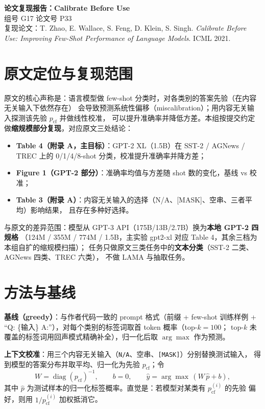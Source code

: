 \documentclass[11pt,a4paper]{ctexart}
\begin{document}
\begin{center}
{\LARGE\bfseries 论文复现报告：Calibrate Before Use}\\[4pt]
{\large 组号 G17 \quad 论文号 P33}\\[2pt]
{\small 复现论文：T. Zhao, E. Wallace, S. Feng, D. Klein, S. Singh.
\emph{Calibrate Before Use: Improving Few-Shot Performance of Language Models}. ICML 2021.}
\end{center}

\section{原文定位与复现范围}

原文的核心声称是：语言模型做 few-shot 分类时，对各类别的答案先验（在内容无关输入下依然存在）
会导致预测系统性偏移（miscalibration）；用内容无关输入探测该先验 $p_{\mathrm{cf}}$ 并做线性校准，
可以提升准确率并降低方差。本组按提交约定做\textbf{缩规模部分复现}，对应原文三处结论：

\begin{itemize}\itemsep1pt
  \item \textbf{Table 4（附录 A，主目标）}：GPT-2 XL（1.5B）在 SST-2 / AGNews / TREC 上的
        0/1/4/8-shot 分类，校准提升准确率并降方差；
  \item \textbf{Figure 1（GPT-2 部分）}：准确率均值与方差随 shot 数的变化，基线 vs 校准；
  \item \textbf{Table 3（附录 A）}：内容无关输入的选择（N/A、[MASK]、空串、三者平均）影响结果，
        且存在多种好选择。
\end{itemize}

与原文的差异范围：模型从 GPT-3 API（175B/13B/2.7B）换为\textbf{本地 GPT-2 四规格}
（124M / 355M / 774M / 1.5B，主实验 gpt2-xl 对应 Table 4，其余三档为本组自扩的缩规模扫描）；
任务只做原文三类任务中的\textbf{文本分类}（SST-2 二类、AGNews 四类、TREC 六类），
不做 LAMA 与抽取任务。

\section{方法与基线}

\textbf{基线（greedy）}：与作者代码一致的 prompt 格式（前缀 + few-shot 训练样例 +
``Q: \{输入\} A:''），对每个类别的标签词取首 token 概率（top-$k{=}100$；
top-$k$ 未覆盖的标签词用回声模式精确补全），归一化后取 $\arg\max$ 作为预测。

\textbf{上下文校准}：用三个内容无关输入（\texttt{N/A}、空串、\texttt{[MASK]}）分别替换测试输入，
得到模型的答案分布并取平均、归一化为先验 $p_{\mathrm{cf}}$；令
\begin{equation}
  W = \operatorname{diag}(p_{\mathrm{cf}})^{-1}, \qquad b = 0, \qquad
  \hat y = \arg\max\,(W\,\hat p + b),
\end{equation}
其中 $\hat p$ 为测试样本的归一化标签概率。直觉是：若模型对某类有 $p_{\mathrm{cf}}^{(i)}$ 的先验
偏好，则用 $1/p_{\mathrm{cf}}^{(i)}$ 加权抵消它。
\end{document}

